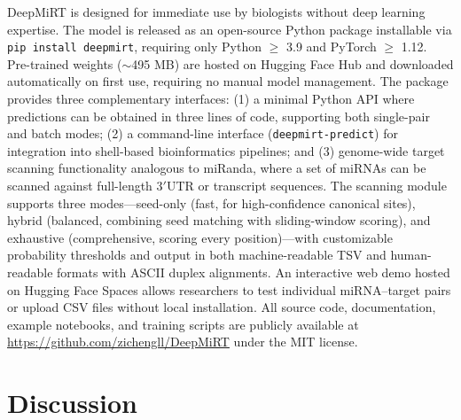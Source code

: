 \documentclass[10pt,a4paper]{article}
\begin{document}
DeepMiRT is designed for immediate use by biologists without deep learning expertise. The model is released as an open-source Python package installable via \texttt{pip install deepmirt}, requiring only Python $\geq$ 3.9 and PyTorch $\geq$ 1.12. Pre-trained weights ($\sim$495 MB) are hosted on Hugging Face Hub and downloaded automatically on first use, requiring no manual model management. The package provides three complementary interfaces: (1) a minimal Python API where predictions can be obtained in three lines of code, supporting both single-pair and batch modes; (2) a command-line interface (\texttt{deepmirt-predict}) for integration into shell-based bioinformatics pipelines; and (3) genome-wide target scanning functionality analogous to miRanda, where a set of miRNAs can be scanned against full-length 3$'$UTR or transcript sequences. The scanning module supports three modes---seed-only (fast, for high-confidence canonical sites), hybrid (balanced, combining seed matching with sliding-window scoring), and exhaustive (comprehensive, scoring every position)---with customizable probability thresholds and output in both machine-readable TSV and human-readable formats with ASCII duplex alignments. An interactive web demo hosted on Hugging Face Spaces allows researchers to test individual miRNA--target pairs or upload CSV files without local installation. All source code, documentation, example notebooks, and training scripts are publicly available at \url{https://github.com/zichengll/DeepMiRT} under the MIT license.

\section{Discussion}
\end{document}
